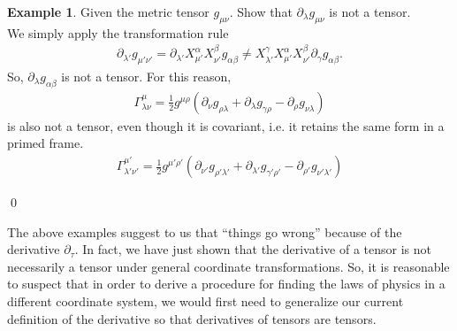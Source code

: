 \documentclass{book}
\theoremstyle{definition}
\newtheorem{exmp}{Example}[section]
\begin{document}
\begin{exmp}
	Given the metric tensor $g_{\mu\nu}$. Show that $\partial_\lambda g_{\mu\nu}$ is not a tensor.\\
	
	We simply apply the transformation rule
	\begin{align*}
	\partial_{\lambda'}g_{\mu'\nu'} = \partial_{\lambda'}X^{\alpha}_{\mu'}X^{\beta}_{\nu'}g_{\alpha\beta} \neq X^{\gamma}_{\lambda'}X^{\alpha}_{\mu'}X^{\beta}_{\nu'}\partial_{\gamma}g_{\alpha\beta}.
	\end{align*}
	So, $\partial_{\lambda}g_{\alpha\beta}$ is not a tensor. For this reason, 
	\begin{align*}
	\Gamma^{\mu}_{\lambda\nu} = \frac{1}{2}g^{\mu\rho}\left( \partial_{\nu}g_{\rho\lambda} + \partial_{\lambda}g_{\gamma\rho} - \partial_{\rho}g_{\nu\lambda}\right) 
	\end{align*}
	is also not a tensor, even though it is covariant, i.e. it retains the same form in a primed frame.
	\begin{align*}
	\Gamma^{\mu'}_{\lambda'\nu'} = \frac{1}{2}g^{\mu'\rho'}\left( \partial_{\nu'}g_{\rho'\lambda'} + \partial_{\lambda'}g_{\gamma'\rho'} - \partial_{\rho'}g_{\nu'\lambda'}\right)
	\end{align*}
\end{exmp}\qed

The above examples suggest to us that ``things go wrong'' because of the derivative $\partial_\tau$. In fact, we have just shown that the derivative of a tensor is not necessarily a tensor under general coordinate transformations. So, it is reasonable to suspect that in order to derive a procedure for finding the laws of physics in a different coordinate system, we would first need to generalize our current definition of the derivative so that derivatives of tensors are tensors.\\
\end{document}

